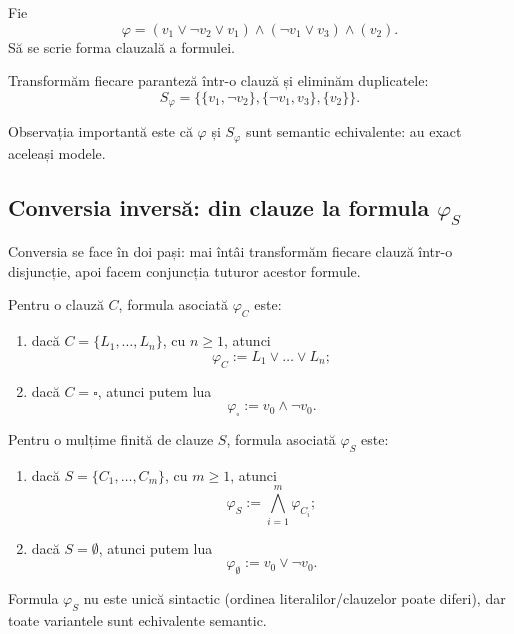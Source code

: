 \begin{ex}
	Fie
	\[
		\varphi = (v_1 \lor \neg v_2 \lor v_1)\land (\neg v_1 \lor v_3)\land (v_2).
	\]
	Să se scrie forma clauzală a formulei.
\end{ex}

\begin{solutie}
	Transformăm fiecare paranteză într-o clauză și eliminăm duplicatele:
	\[
		S_\varphi = \{\{v_1, \neg v_2\}, \{\neg v_1, v_3\}, \{v_2\}\}.
	\]

	Observația importantă este că \( \varphi \) și \( S_\varphi \) sunt semantic echivalente: au exact aceleași modele.
\end{solutie}

\subsection{Conversia inversă: din clauze la formula $\varphi_S$}

Conversia se face în doi pași: mai întâi transformăm fiecare clauză într-o disjuncție, apoi facem conjuncția tuturor acestor formule.

\begin{definition}
	Pentru o clauză \(C\), formula asociată \( \varphi_C \) este:
	\begin{enumerate}
		\item dacă \(C = \{L_1, \dots, L_n\}\), cu \(n \geq 1\), atunci
		      \[
			      \varphi_C := L_1 \lor \dots \lor L_n;
		      \]
		\item dacă \(C = \square\), atunci putem lua
		      \[
			      \varphi_{\square} := v_0 \land \neg v_0.
		      \]
	\end{enumerate}
\end{definition}

\begin{definition}
	Pentru o mulțime finită de clauze \(S\), formula asociată \( \varphi_S \) este:
	\begin{enumerate}
		\item dacă \(S = \{C_1, \dots, C_m\}\), cu \(m \geq 1\), atunci
		      \[
			      \varphi_S := \bigwedge_{i=1}^{m} \varphi_{C_i};
		      \]
		\item dacă \(S = \emptyset\), atunci putem lua
		      \[
			      \varphi_{\emptyset} := v_0 \lor \neg v_0.
		      \]
	\end{enumerate}
\end{definition}

\begin{note}
	Formula \( \varphi_S \) nu este unică sintactic (ordinea literalilor/clauzelor poate diferi), dar toate variantele sunt echivalente semantic.
\end{note}

